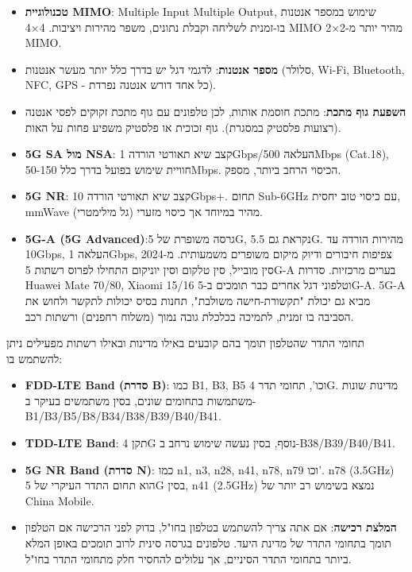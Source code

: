 \begin{itemize}
  \item \textbf{טכנולוגיית MIMO}: Multiple Input Multiple Output, שימוש במספר אנטנות בו-זמנית לשליחה וקבלת נתונים, משפר מהירות ויציבות. 4×4 MIMO מהיר יותר מ-2×2 MIMO.
  \item \textbf{מספר אנטנות}: לדגמי דגל יש בדרך כלל יותר מעשר אנטנות (סלולר, Wi-Fi, Bluetooth, NFC, GPS - כל אחד דורש אנטנה נפרדת).
  \item \textbf{השפעת גוף מתכת}: מתכת חוסמת אותות, לכן טלפונים עם גוף מתכת זקוקים לפסי אנטנה (רצועות פלסטיק במסגרת). גוף זכוכית או פלסטיק משפיע פחות על האות.
\end{itemize}


\begin{itemize}
  \item \textbf{5G SA מול NSA}: קצב שיא תאורטי הורדה 1Gbps/העלאה 500Mbps (Cat.18), חוויית שימוש בפועל בדרך כלל 50-150Mbps. הכיסוי הרחב ביותר, מספק.
  \item \textbf{5G NR}: קצב שיא תאורטי הורדה 10Gbps+. תחום Sub-6GHz עם כיסוי טוב יחסית, mmWave (גל מילימטרי) מהיר במיוחד אך כיסוי מזערי.
  \item \textbf{5G-A (5G Advanced)}:גרסה משופרת של 5G, נקראת גם 5.5G. מהירות הורדה עד 10Gbps, העלאה 1Gbps, צפיפות חיבורים ודיוק מיקום משופרים משמעותית. מ-2024 סין מובייל, סין טלקום וסין יוניקום התחילו לפרוס רשתות 5G-A בערים מרכזיות. סדרות Huawei Mate 70/80, Xiaomi 15/16 וטלפוני דגל אחרים כבר תומכים ב-5G-A. 5G-A מביא גם יכולת "תקשורת-חישה משולבת", תחנות בסיס יכולות לתקשר ולחוש את הסביבה בו זמנית, לתמיכה בכלכלת גובה נמוך (משלוח רחפנים) ורשתות רכב.
\end{itemize}


תחומי התדר שהטלפון תומך בהם קובעים באילו מדינות ובאילו רשתות מפעילים ניתן להשתמש בו:

\begin{itemize}
  \item \textbf{FDD-LTE Band (סדרת B)}: כמו B1, B3, B5 וכו', תחומי תדר 4G. מדינות שונות משתמשות בתחומים שונים, בסין משתמשים בעיקר ב-B1/B3/B5/B8/B34/B38/B39/B40/B41.
  \item \textbf{TDD-LTE Band}: תקן 4G נוסף, בסין נעשה שימוש נרחב ב-B38/B39/B40/B41.
  \item \textbf{5G NR Band (סדרת N)}: כמו n1, n3, n28, n41, n78, n79 וכו'. n78 (3.5GHz) הוא תחום התדר העיקרי של 5G בסין, n41 (2.5GHz) נמצא בשימוש רב יותר של China Mobile.
  \item \textbf{המלצת רכישה}: אם אתה צריך להשתמש בטלפון בחו"ל, בדוק לפני הרכישה אם הטלפון תומך בתחומי התדר של מדינת היעד. טלפונים בגרסה סינית לרוב תומכים באופן המלא ביותר בתחומי התדר הסיניים, אך עלולים להחסיר חלק מתחומי התדר בחו"ל.
\end{itemize}

